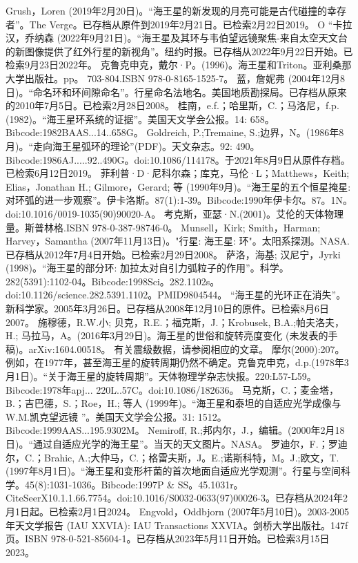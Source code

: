 \begin{enumerate}
 Grush，Loren (2019年2月20日)。“海王星的新发现的月亮可能是古代碰撞的幸存者”。The Verge。已存档从原件到2019年2月21日。已检索2月22日2019。
 O “卡拉汉，乔纳森 (2022年9月21日)。“海王星及其环与韦伯望远镜聚焦-来自太空天文台的新图像提供了红外行星的新视角”。纽约时报。已存档从2022年9月22日开始。已检索9月23日2022年。
 克鲁克申克，戴尔·P。(1996)。海王星和Triton。亚利桑那大学出版社。pp。 703-804.ISBN 978-0-8165-1525-7。
 蓝，詹妮弗 (2004年12月8日)。“命名环和环间隙命名”。行星命名法地名。美国地质勘探局。已存档从原来的2010年7月5日。已检索2月28日2008。
 桂南，e.f.；哈里斯，C.；马洛尼，f.p.(1982)。“海王星环系统的证据”。美国天文学会公报。14: 658。Bibcode:1982BAAS...14..658G。
 Goldreich, P.;Tremaine, S.;边界，N。(1986年8月)。“走向海王星弧环的理论”(PDF)。天文杂志。92: 490。Bibcode:1986AJ.....92..490G。doi:10.1086/114178。于2021年8月9日从原件存档。已检索6月12日2019。
 菲利普·D·尼科尔森；库克，马伦·L；Matthews，Keith; Elias，Jonathan H.; Gilmore，Gerard; 等 (1990年9月)。“海王星的五个恒星掩星: 对环弧的进一步观察”。伊卡洛斯。87(1):1-39。Bibcode:1990年伊卡尔。87。1N。doi:10.1016/0019-1035(90)90020-A。
 考克斯，亚瑟·N.(2001)。艾伦的天体物理量。斯普林格.ISBN 978-0-387-98746-0。
 Munsell，Kirk; Smith，Harman; Harvey，Samantha (2007年11月13日)。"行星: 海王星: 环"。太阳系探测。NASA.已存档从2012年7月4日开始。已检索2月29日2008。
 萨洛，海基; 汉尼宁，Jyrki (1998)。“海王星的部分环: 加拉太对自引力弧粒子的作用”。科学。282(5391):1102-04。Bibcode:1998Sci。282.1102s。doi:10.1126/science.282.5391.1102。PMID9804544。 
 “海王星的光环正在消失”。新科学家。2005年3月26日。已存档从2008年12月10日的原件。已检索8月6日2007。
 施穆德，R.W.小; 贝克，R.E.；福克斯，J.；Krobusek, B.A.;帕夫洛夫，H.; 马拉马，A。(2016年3月29日)。海王星的世俗和旋转亮度变化 (未发表的手稿)。arXiv:1604.00518。
 有关震级数据，请参阅相应的文章。
 摩尔(2000):207。
 例如，在1977年，甚至海王星的旋转周期仍然不确定。克鲁克申克，d.p.(1978年3月1日)。“关于海王星的旋转周期”。天体物理学杂志快报。220:L57-L59。Bibcode:1978年apj... 220L..57C。doi:10.1086/182636。
 马克斯，C.；麦金塔，B.；吉巴德，S.；Roe，H.; 等人 (1999年)。“海王星和泰坦的自适应光学成像与W.M.凯克望远镜 ”。美国天文学会公报。31: 1512。Bibcode:1999AAS...195.9302M。
 Nemiroff, R.;邦内尔，J.，编辑。(2000年2月18日)。“通过自适应光学的海王星”。当天的天文图片。NASA。
 罗迪尔，F.；罗迪尔，C.；Brahic, A.;大仲马，C.；格雷夫斯，J。E.;诺斯科特，M。J.;欧文，T.(1997年8月1日)。“海王星和变形杆菌的首次地面自适应光学观测”。行星与空间科学。45(8):1031-1036。Bibcode:1997P & SS。45.1031r。CiteSeerX10.1.1.66.7754。doi:10.1016/S0032-0633(97)00026-3。已存档从2024年2月1日起。已检索2月1日2024。 
 Engvold，Oddbjorn (2007年5月10日)。2003-2005年天文学报告 (IAU XXVIA): IAU Transactions XXVIA。剑桥大学出版社。147f页。ISBN 978-0-521-85604-1。已存档从2023年5月11日开始。已检索3月15日2023。

\end{enumerate}
